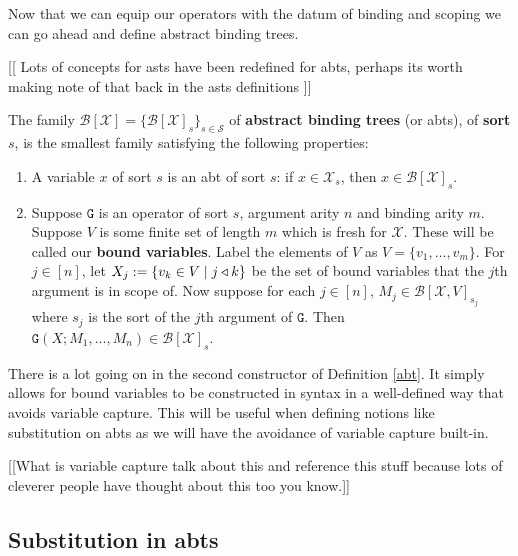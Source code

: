 Now that we can equip our operators with the datum of binding and scoping we can go ahead and define abstract binding trees.

[[ Lots of concepts for asts have been redefined for abts,
perhaps its worth making note of that back in the asts definitions ]]

\begin{defin}\label{abt}
    The family $\mathcal{B}[\mathcal{X}] = \{ \mathcal{B}[\mathcal{X}]_s \}_{s \in \mathcal{S}}$ of \textbf{abstract binding trees} (or abts), of \textbf{sort} $s$, is the smallest family satisfying the following properties:
    
    \begin{enumerate}
        \item A variable $x$ of sort $s$ is an abt of sort $s$: if $x \in \mathcal{X}_s$, then $x \in \mathcal{B}[\mathcal{X}]_s$.
        \item Suppose $\mathtt{G}$ is an operator of sort $s$, argument arity $n$ and binding arity $m$. Suppose $V$ is some finite set of length $m$ which is fresh for $\mathcal{X}$. These will be called our \textbf{bound variables}. Label the elements of $V$ as $V= \{ v_1, \dots, v_m\}$. For $j\in [n]$, let $X_j:=\{ v_k \in V \mid j \triangleleft k\}$ be the set of bound variables that the $j$th argument is in scope of. Now suppose for each $j \in [n]$, $M_j \in \mathcal{B}[\mathcal{X},V]_{s_j}$ where $s_j$ is the sort of the $j$th argument of $\mathtt{G}$. Then $\mathtt{G}(X;M_1,\dots, M_n) \in \mathcal{B}[\mathcal{X}]_s$.
    \end{enumerate}
\end{defin}

\begin{remark}
    There is a lot going on in the second constructor of Definition \ref{abt}. It simply allows for bound variables to be constructed in syntax in a well-defined way that avoids variable capture. This will be useful when defining notions like substitution on abts as we will have the avoidance of variable capture built-in.
\end{remark}

[[What is variable capture talk about this and reference this stuff because lots of cleverer people have thought about this too you know.]]
\subsection{Substitution in abts}

